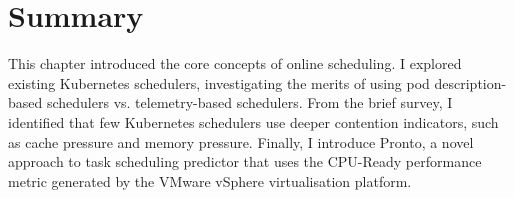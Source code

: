 %
%
%
\section{Summary}
This chapter introduced the core concepts of online scheduling. I explored
existing Kubernetes schedulers, investigating the merits of using pod
description-based schedulers vs. telemetry-based schedulers. From the brief
survey, I identified that few Kubernetes schedulers use deeper contention
indicators, such as cache pressure and memory pressure. Finally, I introduce
Pronto, a novel approach to task scheduling predictor that uses the CPU-Ready
performance metric generated by the VMware vSphere virtualisation platform.

